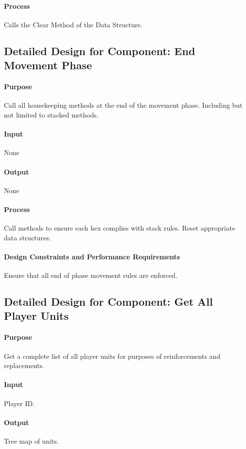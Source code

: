\documentclass[12pt,a4paper,titlepage]{article}
\begin{document}
\paragraph{Process} Calls the Clear Method of the Data Structure.

\subsection{Detailed Design for Component: End Movement Phase}
\paragraph{Purpose} Call all housekeeping methods at the end of the movement phase.  Including but not limited to stacked methods.
\paragraph{Input} None
\paragraph{Output} None
\paragraph{Process} Call methods to ensure each hex complies with stack rules. Reset appropriate data structures.
\paragraph{Design Constraints and Performance Requirements} Ensure that all end of phase movement rules are enforced.

\subsection{Detailed Design for Component: Get All Player Units}
\paragraph{Purpose} Get a complete list of all player units for purposes of reinforcements and replacements.
\paragraph{Input} Player ID.
\paragraph{Output} Tree map of units.
\end{document}
